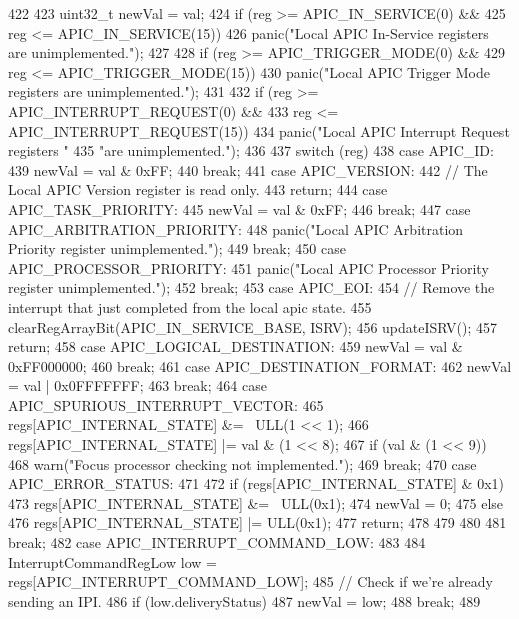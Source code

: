 \begin{DoxyCode}
422 {
423     uint32_t newVal = val;
424     if (reg >= APIC_IN_SERVICE(0) &&
425             reg <= APIC_IN_SERVICE(15)) {
426         panic("Local APIC In-Service registers are unimplemented.\n");
427     }
428     if (reg >= APIC_TRIGGER_MODE(0) &&
429             reg <= APIC_TRIGGER_MODE(15)) {
430         panic("Local APIC Trigger Mode registers are unimplemented.\n");
431     }
432     if (reg >= APIC_INTERRUPT_REQUEST(0) &&
433             reg <= APIC_INTERRUPT_REQUEST(15)) {
434         panic("Local APIC Interrupt Request registers "
435                 "are unimplemented.\n");
436     }
437     switch (reg) {
438       case APIC_ID:
439         newVal = val & 0xFF;
440         break;
441       case APIC_VERSION:
442         // The Local APIC Version register is read only.
443         return;
444       case APIC_TASK_PRIORITY:
445         newVal = val & 0xFF;
446         break;
447       case APIC_ARBITRATION_PRIORITY:
448         panic("Local APIC Arbitration Priority register unimplemented.\n");
449         break;
450       case APIC_PROCESSOR_PRIORITY:
451         panic("Local APIC Processor Priority register unimplemented.\n");
452         break;
453       case APIC_EOI:
454         // Remove the interrupt that just completed from the local apic state.
455         clearRegArrayBit(APIC_IN_SERVICE_BASE, ISRV);
456         updateISRV();
457         return;
458       case APIC_LOGICAL_DESTINATION:
459         newVal = val & 0xFF000000;
460         break;
461       case APIC_DESTINATION_FORMAT:
462         newVal = val | 0x0FFFFFFF;
463         break;
464       case APIC_SPURIOUS_INTERRUPT_VECTOR:
465         regs[APIC_INTERNAL_STATE] &= ~ULL(1 << 1);
466         regs[APIC_INTERNAL_STATE] |= val & (1 << 8);
467         if (val & (1 << 9))
468             warn("Focus processor checking not implemented.\n");
469         break;
470       case APIC_ERROR_STATUS:
471         {
472             if (regs[APIC_INTERNAL_STATE] & 0x1) {
473                 regs[APIC_INTERNAL_STATE] &= ~ULL(0x1);
474                 newVal = 0;
475             } else {
476                 regs[APIC_INTERNAL_STATE] |= ULL(0x1);
477                 return;
478             }
479 
480         }
481         break;
482       case APIC_INTERRUPT_COMMAND_LOW:
483         {
484             InterruptCommandRegLow low = regs[APIC_INTERRUPT_COMMAND_LOW];
485             // Check if we're already sending an IPI.
486             if (low.deliveryStatus) {
487                 newVal = low;
488                 break;
489             }
}}}
\end{DoxyCode}
